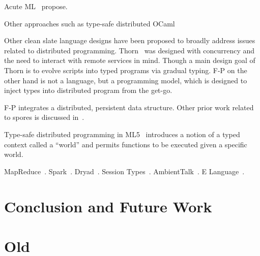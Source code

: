 \documentclass[preprint]{sigplanconf}
\theoremstyle{definition}
\theoremstyle{definition}
\begin{document}
Acute ML~\cite{AcuteML} propose.

Other approaches such as type-safe distributed OCaml~\cite{DistOCaml}

Other clean slate language designs have been proposed to broadly address
issues related to distributed programming. Thorn~\cite{Thorn} was designed
with concurrency and the need to interact with remote services in mind. Though
a main design goal of Thorn is to evolve scripts into typed programs via
gradual typing. F-P on the other hand is not a language, but a programming
model, which is designed to inject types into distributed program from the
get-go.

F-P integrates a distributed, persistent data structure. Other prior work
related to spores is discussed in~\cite{Spores}.

Type-safe distributed programming in ML5~\cite{Tom7} introduces a notion of a
typed context called a ``world'' and permits functions to be executed given a
specific world.

MapReduce~\cite{MapReduce}. Spark~\cite{Spark}. Dryad~\cite{Dryad}. Session
Types~\cite{SessionTypes}. AmbientTalk~\cite{AmbientTalk}. E
Language~\cite{ELang}.



\section{Conclusion and Future Work}
\label{sec:conclusion-future-work}

\section{Old}



\end{document}
